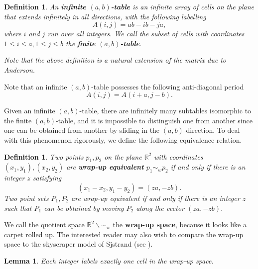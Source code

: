 \documentclass[a4paper,12pt]{article}
\newtheorem{defi}[thm]{Definition}
\newtheorem{lem}[thm]{Lemma}
\begin{document}
\begin{defi}  \label{deftable}
An \textbf{{infinite   $(a,b)$-table}} is an infinite array  of cells on the plane that extends infinitely in all directions, with the following labelling
\begin{equation}
     A(i,j)= ab-ib-ja,
\end{equation}
where $i$ and $j$ run over all integers. We call the subset of cells with coordinates  $1\leq i\leq a, 1\leq j \leq b$ the \textbf{finite {$(a,b)$-table}}.

Note that the above definition is a natural extension of the matrix due to Anderson.

\end{defi}
Note that an infinite $(a,b)$-table possesses the following anti-diagonal period
\begin{equation} \label{antiDiagPeriod}
  A(i,j)=A(i+a,j-b).
\end{equation}



Given an infinite $(a,b)$-table, there are infinitely many subtables isomorphic to the finite $(a,b)$-table, and it is impossible to distinguish one from another since one can be obtained from another by sliding in the $(a,b)$-direction. To deal with this phenomenon rigorously, we define the following equivalence relation.

\begin{defi}
  Two points  $p_1,p_2$  on the plane $\mathbb{R}^2$ with coordinates $(x_1,y_1),(x_2,y_2)$   are \textbf{ wrap-up equivalent} $p_1 \sim_{w} p_2$  if and only if there is an integer $z$ satisfying
  \[
    (x_1-x_2,y_1-y_2)= (za,-zb).
  \]
Two point sets $P_1,P_2$  are wrap-up equivalent if and only if  there is an integer $z$ such that $P_1$ can be obtained by moving $P_2$ along the vector $(za,-zb)$.
\end{defi}

We call the quotient space  $\mathbb{R}^2 \backslash \sim_{w}$  the \textbf{wrap-up space}, because it looks like a carpet rolled up.
The interested reader may also wish to compare the wrap-up space to the skyscraper model of Sjstrand (see \cite{10n}).

\begin{lem}\label{eachIntegerOnce}
Each integer labels exactly one cell in the wrap-up space.
\end{lem}
\end{document}

